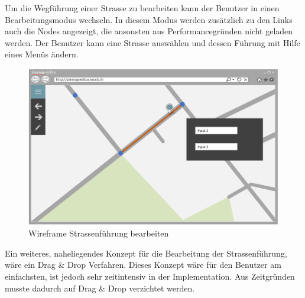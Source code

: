 \newpage
\noindent
Um die Wegführung einer Strasse zu bearbeiten kann der Benutzer in einen Bearbeitungsmodus wechseln. In diesem Modus werden zusätzlich zu den Links auch die Nodes angezeigt, die ansonsten aus Performancegründen nicht geladen werden. Der Benutzer kann eine Strasse auswählen und dessen Führung mit Hilfe eines Menüs ändern.
\begin{figure}[H]
\centering
\includegraphics[height=7cm]{images/KonzeptChangeStreet.PNG}
\caption{Wireframe Strassenführung bearbeiten}
\label{fig:concepteditStreet}
\end{figure}
\noindent
Ein weiteres, naheliegendes Konzept für die Bearbeitung der Strassenführung, wäre ein Drag \& Drop Verfahren. Dieses Konzept wäre für den Benutzer am einfachsten, ist jedoch sehr zeitintensiv in der Implementation. Aus Zeitgründen musste dadurch auf Drag \& Drop verzichtet werden.
